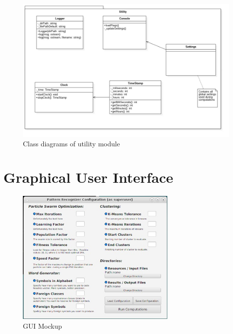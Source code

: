 \documentclass{mini}
\begin{document}
%
%
\begin{figure}[H]
    \centering
    \includegraphics[width=1.0\textwidth]{images/utility_class.jpg}
    \caption{Class diagrams of utility module}
    \label{fig:utility_class}
\end{figure}






%
%
\newpage
\section{Graphical User Interface}
\begin{figure}
    \begin{center}
        \includegraphics[width=0.7\textwidth]{images/mock_gui.jpg}
    \end{center}
    \caption{GUI Mockup}
    \label{fig:gui_look}
\end{figure}
\end{document}
